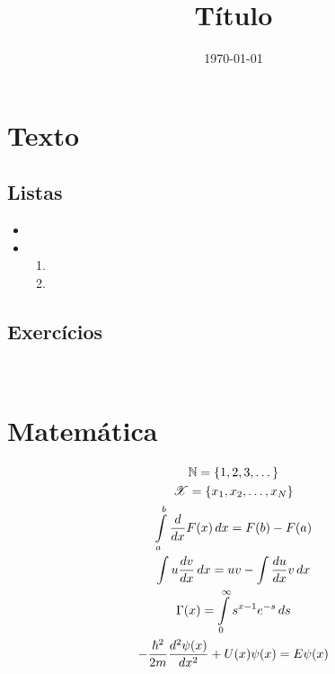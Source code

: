 \documentclass[red, ccm, assignment]{templateccm}
\title{Título}              %
\date{\today}               %
\institute{Instituto}
\begin{document}
\maketitle

\section{Texto}

\lipsum[1-2]

\subsection{Listas}

\begin{itemize}
    \item \lipsum[3-3]
    \item \lipsum[4-4]
    \begin{enumerate}
        \item \lipsum[5-5]
        \item \lipsum[6-6]
    \end{enumerate}
\end{itemize}

\subsection{Exercícios}

\begin{exercise}
    \item \lipsum[7-7]
    \item \lipsum[8-8]
    \item ~
    \begin{exercise}
        \item \lipsum[9-9]
        \item \lipsum[10-10]
    \end{exercise}
\end{exercise}

\section{Matemática}

\begin{gather*}
    \mathbb{N} = \{ 1, 2, 3, \dots \} \\
    \mathscr{X} = \{ x_1, x_2, \dots, x_N \} \\
    \int\limits_a^b {\frac{d}{dx} F(x) \, dx}  = F(b) - F(a) \\
    \int u \frac{dv}{dx} \, dx = uv - \int \frac{du}{dx} v \, dx \\
    \Gamma(x) = \int\limits_0^\infty s^{x - 1} e^{-s} \, ds \\
    -\frac{\hbar^2}{2m}\frac{d^2 \psi(x)}{dx^2} + U(x)\psi (x) = E \psi(x)
\end{gather*}
\end{document}
